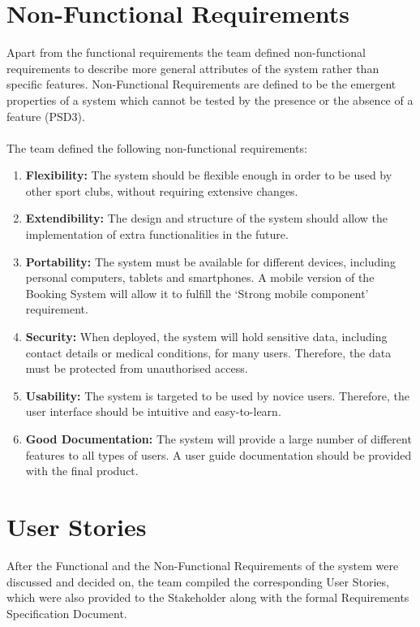 \documentclass{l3proj}
\begin{document}
\section{Non-Functional Requirements}
\par
Apart from the functional requirements the team defined non-functional requirements to describe more general attributes of the system rather than specific features. Non-Functional Requirements are defined to be the emergent properties of a system which cannot be tested by the presence or the absence of a feature (PSD3). \\
\\
The team defined the following non-functional requirements:
\begin{enumerate}
	\item \textbf{Flexibility:} The system should be flexible enough in order to be used by other sport clubs, without requiring extensive changes.
	\item \textbf{Extendibility:} The design and structure of the system should allow the implementation of extra functionalities in the future.
	\item \textbf{Portability:} The system must be available for different devices, including personal computers, tablets and smartphones. A mobile version of the Booking System will allow it to fulfill the `Strong mobile component’ requirement.
	\item \textbf{Security:} When deployed, the system will hold sensitive data, including contact details or medical conditions, for many users. Therefore, the data must be protected from unauthorised access.
	\item \textbf{Usability:} The system is targeted to be used by novice users. Therefore, the user interface should be intuitive and easy-to-learn.
	\item \textbf{Good Documentation:} The system will provide a large number of different features to all types of users. A user guide documentation should be provided with the final product. 
\end{enumerate}

\section{User Stories}
\par
After the Functional and the Non-Functional Requirements of the system were discussed and decided on, the team compiled the corresponding User Stories, which were also provided to the Stakeholder along with the formal Requirements Specification Document.
\end{document}
